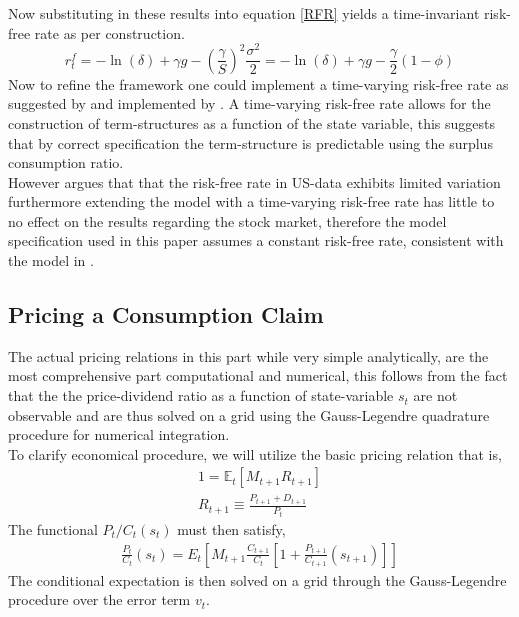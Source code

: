 Now substituting in these results into equation \eqref{RFR} yields a time-invariant risk-free rate as per construction.
\begin{equation}
r_{t}^{f}=-\ln (\delta)+\gamma g-\left(\frac{\gamma}{S}\right)^{2} \frac{\sigma^{2}}{2}=-\ln (\delta)+\gamma g-\frac{\gamma}{2}(1-\phi) \label{RFR1}
\end{equation}
Now to refine the framework one could implement a time-varying risk-free rate as suggested by \citet{Campbell1999} and implemented by \citet{Wachter2005}. A time-varying risk-free rate allows for the construction of term-structures as a function of the state variable, this suggests that by correct specification the term-structure is predictable using the surplus consumption ratio.\\
However \citet{Campbell1999} argues that that the risk-free rate in US-data exhibits limited variation furthermore extending the model with a time-varying risk-free rate has little to no effect on the results regarding the stock market, therefore the model specification used in this paper assumes a constant risk-free rate, consistent with the model in \citet{Campbell1999}.

\subsection{Pricing a Consumption Claim}
The actual pricing relations in this part while very simple analytically, are the most comprehensive part computational and numerical, this follows from the fact that the the price-dividend ratio as a function of state-variable $s_t$ are not observable and are thus solved on a grid using the Gauss-Legendre quadrature procedure for numerical integration. \\
\newline
To clarify economical procedure, we will utilize the basic pricing relation that is,
\begin{align}
    1 = \mathbb{E}_t \left [ M_{t+1}R_{t+1} \right] \nonumber \\
    R_{t+1} \equiv \frac{P_{t+1} + D_{t+1}}{P_t}
\end{align}
The functional $P_t/C_t(s_t)$ must then satisfy,
\begin{align}
    \frac{P_{t}}{C_{t}}\left(s_{t}\right)=E_{t}\left[M_{t+1} \frac{C_{t+1}}{C_{t}}\left[1+\frac{P_{t+1}}{C_{t+1}}\left(s_{t+1}\right)\right]\right] \label{PCRatio}
\end{align}
The conditional expectation is then solved on a grid through the Gauss-Legendre procedure over the error term $v_t$.

